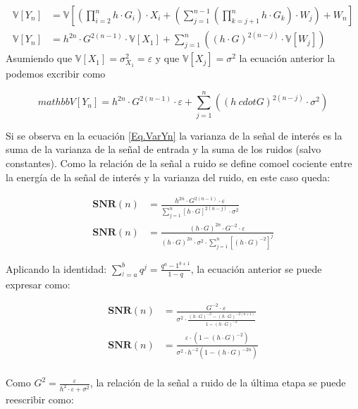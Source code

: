			\begin{align*}
				\mathbb{V}[Y_n] &= \mathbb{V}\left[ \left(\prod_{i=2}^{n}{h \cdot G_i} \right) \cdot X_i + \left( \sum_{j=1}^{n-1} \left( \prod_{k=j+1}^{n} h \cdot G_k \right) \cdot W_j \right) + W_n \right] \\
				\mathbb{V}[Y_n] &= h^{2n} \cdot G^{2(n-1)} \cdot \mathbb{V}[X_1] + \sum_{j=1}^{n} \left( (h \cdot G)^{2(n-j)} \cdot \mathbb{V}[W_j] \right)
			\end{align*}
\indent Asumiendo que $\mathbb{V}[X_1] = \sigma _{X_1}^2 = \varepsilon$ y que $\mathbb{V}[X_j] = \sigma ^2$ la ecuación anterior la podemos excribir como

			\begin{equation}
				mathbb{V}[Y_n] = h^{2n} \cdot G^{2(n-1)} \cdot \varepsilon + \sum_{j=1}^{n} \left( (h \ cdot G)^{2(n-j)} \cdot \sigma ^2 \right)
				\label{Eq.VarYn}
			\end{equation}
			
\indent Si se observa en la ecuación \ref{Eq.VarYn} la varianza de la señal de interés es la suma de la varianza de la señal de entrada y la suma de los ruidos (salvo constantes). Como la relación de la señal a ruido se define comoel cociente entre la energía  de la señal de interés y la varianza del ruido, en este caso queda:
	
			\begin{align*}
			\textbf{SNR}(n) &=\frac{h^{2n} \cdot G^{2(n-1) } \cdot \varepsilon}{\sum_{j=1}^{n} \left[h \cdot G \right] ^{2(n-j)} \cdot \sigma ^2} \\
			\textbf{SNR}(n) &= \frac{\left(h \cdot G \right) ^{2n} \cdot G^{-2} \cdot \varepsilon}{\left(h \cdot G \right) ^{2n} \cdot \sigma ^2 \cdot \sum_{j=1}^{n} \left[ (h \cdot G) ^{-2} \right] ^j }
			\end{align*}
			
\indent Aplicando la identidad: $\sum_{^j=a}^{b}q^j = \frac{q^a - 1^{b+1}}{1 - q}$, la ecuación anterior se puede expresar como:

			\begin{align*}
				\textbf{SNR}(n) &= \frac{G^{-2} \cdot \varepsilon}{\sigma ^2 \cdot \frac{(h \cdot G)^{-2} -(h \cdot G)^{-2(n+1)}}{1-(h \cdot G)^{-2}}} \\
				\textbf{SNR}(n) &= \frac{\varepsilon \cdot (1-(h \cdot G)^{-2})}{\sigma ^2 \cdot h^{-2} (1 - (h \cdot G)^{-2n})}\\
			\end{align*}

\indent Como $G^2 = \frac{\varepsilon}{h^2 \cdot \varepsilon + \sigma ^2}$, la relación de la señal a ruido de la última etapa se puede reescribir como:

